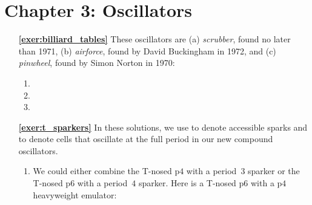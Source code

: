 \hypertarget{solutions_oscillators}{}\label{solutions_oscillators}
\section*{Chapter 3: Oscillators}
\renewcommand{\chapterfolder}{oscillators/}

\begin{multicols}{2}
	\begin{itemize}[leftmargin=0em]
		\item[\bf\color{ocre}\sffamily\ref{exer:billiard_tables}] These oscillators are (a) \emph{scrubber}, found no later than 1971, (b) \emph{airforce}, found by David Buckingham in 1972, and (c) \emph{pinwheel}, found by Simon Norton in 1970: \\[-0.6em]
		\begin{enumerate}[leftmargin=1.5em,label=\bf\color{ocre}(\alph*)]
			\item {}
			
			\item {}
			
			\item {}
		\end{enumerate}
		
		
		\item[\bf\color{ocre}\sffamily\ref{exer:t_sparkers}] In these solutions, we use  to denote accessible sparks and  to denote cells that oscillate at the full period in our new compound oscillators.
		\begin{enumerate}[leftmargin=1.5em,label=\bf\color{ocre}(\alph*)]
			\item We could either combine the T-nosed p$4$ with a period~$3$ sparker or the T-nosed p$6$ with a period~$4$ sparker. Here is a T-nosed p$6$ with a p$4$ heavyweight emulator: \\[-0.6em]
			
			 \\[-0.8em]
			

\end{enumerate}
\end{itemize}
\end{multicols}
